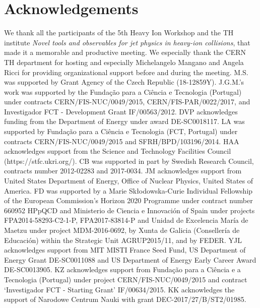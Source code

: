 \documentclass{article}
\begin{document}
\section*{Acknowledgements} 
We thank all the participants of the 5th Heavy Ion Workshop and the TH institute {\sl Novel tools and observables for jet physics in heavy-ion collisions}, that made it a memorable and productive meeting.
We especially thank the CERN TH department for hosting and especially Michelangelo Mangano and Angela Ricci for providing organizational support before and during the meeting.
M.S. was supported by Grant Agency of the Czech Republic (18-12859Y).
J.G.M.'s work was supported  by the Funda{\c c}{\~ a}o para a Ci{\^ e}ncia e Tecnologia (Portugal) under contracts CERN/FIS-NUC/0049/2015, CERN/FIS-PAR/0022/2017, and Investigador FCT - Development Grant IF/00563/2012.
DVP acknowledges funding from the Department of Energy under award DE-SC0018117.
LA was supported by Funda{\c c}{\~ a}o para a Ci{\^ e}ncia e Tecnologia (FCT, Portugal) under contracts CERN/FIS-NUC/0049/2015 and SFRH/BPD/103196/2014.
HAA acknowledges support from the Science and Technology Facilities Council (https://stfc.ukri.org/).
CB was supported in part by Swedish Research Council, contracts number 2012-02283 and 2017-0034.
JM acknowledges support from United States Department of Energy, Office of Nuclear Physics, United States of America.
FD was supported by a Marie Sk\l{}odowska-Curie Individual Fellowship of the European Commission's Horizon 2020 Programme under contract number 660952 HPpQCD and Ministerio de Ciencia e Innovaci{\' o}n of Spain under projects FPA2014-58293-C2-1-P, FPA2017-83814-P and Unidad de Excelencia Mar{\' i}a de Maetzu under project MDM-2016-0692, by Xunta de Galicia (Conseller{\' i}a de Educaci{\' o}n) within the Strategic Unit AGRUP2015/11, and by FEDER.
YJL acknowledges support from MIT MISTI France Seed Fund, US Department of Energy Grant DE-SC0011088 and US Department of Energy Early Career Award DE-SC0013905.
KZ acknowledges support from Funda\c{c}\~{a}o para a Ci\^{e}ncia e a Tecnologia (Portugal) under project CERN/FIS-NUC/0049/2015 and contract `Investigador FCT - Starting Grant' IF/00634/2015.
KK acknowledges the support of Narodowe Centrum Nauki with grant DEC-2017/27/B/ST2/01985.

\appendix





\end{document}

